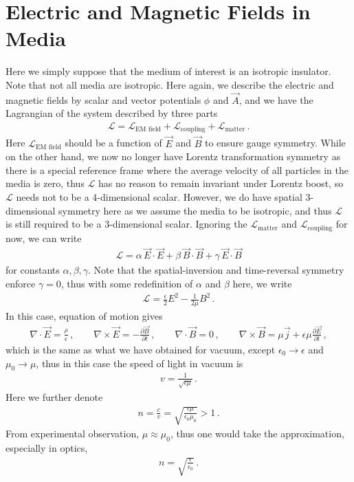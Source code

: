 \documentclass[11pt, onesided]{book}
\theoremstyle{break}
\theoremstyle{break}
\newcommand{\pd}{\partial}
\begin{document}
\section[Electric and Magnetic Fields in Media]{\color{red}Electric and Magnetic Fields in Media\color{black}}
Here we simply suppose that the medium of interest is an isotropic insulator. Note that not all media are isotropic. Here again, we describe the electric and magnetic fields by scalar and vector potentials $\phi$ and $\vec{A}$, and we have the Lagrangian of the system described by three parts
\begin{align*}
\mathcal{L} = \mathcal{L}_{\text{EM field}} + \mathcal{L}_{\text{coupling}} + \mathcal{L}_{\text{matter}}\,.
\end{align*}
Here $\mathcal{L}_{\text{EM field}}$ should be a function of $\vec{E}$ and $\vec{B}$ to ensure gauge symmetry. While on the other hand, we now no longer have Lorentz transformation symmetry as there is a special reference frame where the average velocity of all particles in the media is zero, thus $\mathcal{L}$ has no reason to remain invariant under Lorentz boost, so $\mathcal{L}$ needs not to be a $4$-dimensional scalar. However, we do have spatial $3$-dimensional symmetry here as we assume the media to be isotropic, and thus $\mathcal{L}$ is still required to be a $3$-dimensional scalar. Ignoring the $\mathcal{L}_{\text{matter}}$ and $\mathcal{L}_{\text{coupling}}$ for now, we can write
\begin{align*}
\mathcal{L} = \alpha\, \vec{E}\cdot \vec{E} + \beta \, \vec{B}\cdot \vec{B} + \gamma \, \vec{E}\cdot \vec{B}
\end{align*}
for constants $\alpha,\beta,\gamma$. Note that the spatial-inversion and time-reversal symmetry enforce $\gamma = 0$, thus with some redefinition of $\alpha$ and $\beta$ here, we write
\begin{align*}
\mathcal{L} = \frac{\epsilon}{2}E^2 -\frac{1}{2\mu}B^2\,. 
\end{align*}
In this case, equation of motion gives
\begin{align*}
\nabla \cdot \vec{E} = \frac{\rho}{\epsilon}\,,\qquad
\nabla \times \vec{E} = -\frac{\pd \vec{B}}{\pd t}\,,\qquad
\nabla \cdot \vec{B} =0 \,,\qquad
\nabla \times \vec{B} = \mu \vec{j} + \epsilon \mu \frac{\pd \vec{E}}{\pd t}\,,
\end{align*}
which is the same as what we have obtained for vacuum, except $\epsilon_0 \to \epsilon$ and $\mu_0 \to \mu$, thus in this case the speed of light in vacuum is
\begin{align*}
v = \frac{1}{\sqrt{\epsilon \mu}}\,.
\end{align*}
Here we further denote
\begin{align*}
n = \frac{c}{v} = \sqrt{\frac{\epsilon\mu}{\epsilon_0 \mu_0}} > 1\,.
\end{align*}
From experimental observation, $\mu \approx \mu_0$, thus one would take the approximation, especially in optics, 
\begin{align*}
n = \sqrt{\frac{\epsilon}{\epsilon_0}}\,.
\end{align*}
\end{document}
